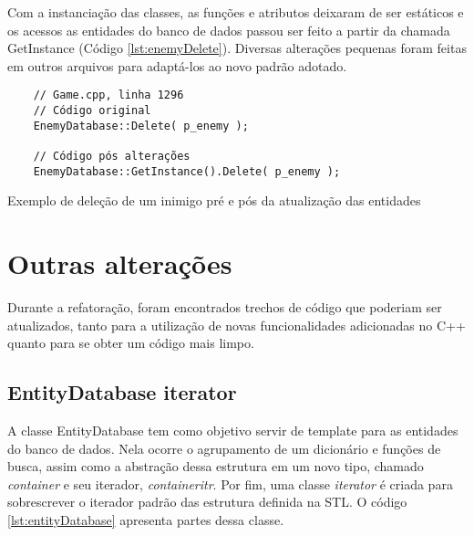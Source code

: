 Com a instanciação das classes, as funções e atributos deixaram de ser estáticos e os acessos 
as entidades do banco de dados passou ser feito a partir da chamada GetInstance (Código \ref{lst:enemyDelete}). 
Diversas alterações pequenas foram feitas em outros arquivos para adaptá-los ao novo padrão adotado.

\begin{listing}[!ht]
    \begin{verbatim}
    // Game.cpp, linha 1296
    // Código original
    EnemyDatabase::Delete( p_enemy );

    // Código pós alterações
    EnemyDatabase::GetInstance().Delete( p_enemy );
    \end{verbatim}
\caption{Exemplo de deleção de um inimigo pré e pós da atualização das entidades}
\label{lst:enemyDelete}
\end{listing}

\section{Outras alterações}

Durante a refatoração, foram encontrados trechos de código que poderiam ser atualizados, tanto
para a utilização de novas funcionalidades adicionadas no C++ quanto para se obter um código mais limpo.

\subsection{EntityDatabase iterator}

A classe EntityDatabase tem como objetivo servir de template para as entidades do banco de dados. 
Nela ocorre o agrupamento de um dicionário e funções de busca, assim como a abstração dessa 
estrutura em um novo tipo, chamado \textit{container} e seu iterador, \textit{containeritr}. 
Por fim, uma classe \textit{iterator} é criada para sobrescrever o iterador padrão das estrutura 
definida na STL. O código \ref{lst:entityDatabase} apresenta partes dessa classe.

